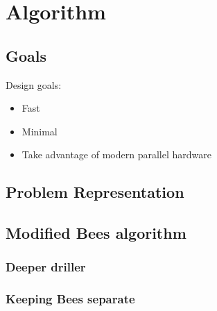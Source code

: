 
\chapter{Algorithm}


\section{Goals}

Design goals:
\begin{itemize}
   \item Fast
   \item Minimal
   \item Take advantage of modern parallel hardware
\end{itemize}


\section{Problem Representation}

\section{Modified Bees algorithm}





\subsection{Deeper driller}

\subsection{Keeping Bees separate}

